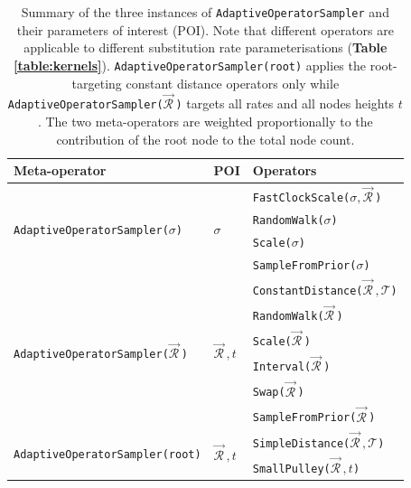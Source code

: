 \documentclass[10pt,letterpaper]{article}
\begin{document}
\begin{table}[h!]
\centering
\begin{tabular}{|l l l|} 
 \hline
 Meta-operator & POI & Operators \\
\hline
 \multirow{4}{*}{\texttt{AdaptiveOperatorSampler($\sigma$)}} & \multirow{4}{*}{$\sigma$} & \texttt{FastClockScale($\sigma, \vec{\mathcal{R}}^{\,}$)} \\ 
 && \texttt{RandomWalk($\sigma$)}  \\
 && \texttt{Scale($\sigma$)}  \\
 && \texttt{SampleFromPrior($\sigma$)}  \\
 \hline
  \multirow{6}{*}{\texttt{AdaptiveOperatorSampler($\vec{\mathcal{R}}^{\,}$)}} & \multirow{6}{*}{$\vec{\mathcal{R}}^{\,}, t$} & \texttt{ConstantDistance($\vec{\mathcal{R}}^{\,}, \mathcal{T}$)}   \\ 
&& \texttt{RandomWalk($\vec{\mathcal{R}}^{\,}$)}  \\
&& \texttt{Scale($\vec{\mathcal{R}}^{\,}$)}   \\
&& \texttt{Interval($\vec{\mathcal{R}}^{\,}$)}   \\
&& \texttt{Swap($\vec{\mathcal{R}}^{\,}$)}  \\
&& \texttt{SampleFromPrior($\vec{\mathcal{R}}^{\,}$)} \\
 \hline
   \multirow{2}{*}{\texttt{AdaptiveOperatorSampler(root)}} & \multirow{2}{*}{$\vec{\mathcal{R}}^{\,}, t$} & \texttt{SimpleDistance($\vec{\mathcal{R}}^{\,}, \mathcal{T}$)}  \\ 
&&  \texttt{SmallPulley($\vec{\mathcal{R}}^{\,}, t$)}  \\
 \hline
\end{tabular}
\caption{Summary of the three instances of \texttt{AdaptiveOperatorSampler} and their parameters of interest (POI).
Note that different operators are applicable to different substitution rate parameterisations (\textbf{Table \ref{table:kernels}}). 
\texttt{AdaptiveOperatorSampler(root)} applies the root-targeting constant distance operators only \cite{zhang2020improving} while \texttt{AdaptiveOperatorSampler($\vec{\mathcal{R}}^{\,}$)} targets all rates and all nodes heights $t$. 
The two meta-operators are weighted proportionally to the contribution of the root node to the total node count. }
\label{table:adaptiveSampling}
\end{table}



\end{document}
